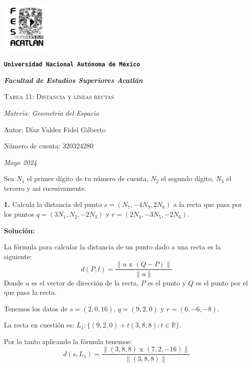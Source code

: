 \documentclass{article}
\begin{document}
\begin{titlepage}
   \centering  
   {\includegraphics[width=2.5cm]{logo.png}\par}
   {\texttt{\bfseries \LARGE Universidad Nacional Autónoma de México} \par}
   \vspace{1cm}
   {\itshape \Large \bfseries Facultad de Estudios Superiores Acatlán \par}
   \vspace{3cm}
   {\scshape \Huge Tarea 11: Distancia y líneas rectas\par}
   \vspace {3cm}
   {\slshape \Large Materia: Geometria del Espacio \par}
   \vspace{2cm}
   {\Large Autor: Díaz Valdez Fidel Gilberto\par}
   {\Large Número de cuenta: 320324280\par}
   \vfill
   {\itshape Mayo 2024 \par}
\end{titlepage}
Sea $N_1$ el primer dígito de tu número de cuenta, $N_2$ el segundo dígito, $N_3$ el tercero y así
sucesivamente.
\vspace{10pt}


\textbf{1.} Calcula la distancia del punto $s = (N_7, -4N_9, 2N_8)$ a la recta que pasa por los puntos $q = (3N_1, N_2, -2N_3)$ y
$r= (2N_4, -3N_5,-2N_6)$.
\vspace{10pt}


\textbf{Solución:}
\vspace{10pt}


La fórmula para calcular la distancia de un punto dado a una recta es la siguiente:
$$d (P, l) = \frac{\|u \text{ x } (Q-P)\|}{\|u\|}$$
Donde $u$ es el vector de dirección de la recta, $P$ es el punto y $Q$ es el punto por el que pasa la recta.


Tenemos los datos de $s = (2, 0, 16)$,  $q = (9, 2, 0)$ y $r= (6, -6,-8)$.


La recta en cuestión es: $L_1:\{(9, 2, 0)+t(3, 8, 8): t \in \mathbb{R}\}$.


Por lo tanto aplicando la fórmula tenemos:
$$d(s,L_1) = \frac{\|(3,8,8) \text{ x }(7,2,-16)\|}{\|(3, 8, 8)\|}$$
\end{document}
